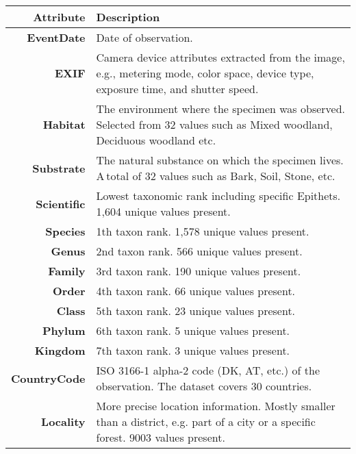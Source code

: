 \documentclass[10pt,twocolumn,letterpaper]{article}
\begin{document}
\begin{table}[b!]
\begin{center}
\vspace{-0.2cm}
\setlength{\tabcolsep}{0.28em} \begin{tabular}{| r  p{6.0cm}@{\hskip 5pt}  |}
    \hline
    \small{\textbf{Attribute}} & \small{\textbf{Description}} \\
    \hline
        \footnotesize{\textbf{EventDate}} & \footnotesize{Date of observation.} \\
\footnotesize{\textbf{EXIF}} & \footnotesize{Camera device attributes extracted from the image, e.g., metering mode, color space, device type, exposure time, and shutter speed.} \\
        \hline
        \footnotesize{\textbf{Habitat}} & \footnotesize{The environment where the specimen was observed. Selected from 32 values such as Mixed woodland, Deciduous woodland etc.}\\
        \footnotesize{\textbf{Substrate}} & \footnotesize{The natural substance on which the specimen lives. A\,total of 32 values such as Bark, Soil, Stone, etc.} \\
        \hline
        \footnotesize\textbf{{Scientific}} & \footnotesize{Lowest taxonomic rank including specific Epithets. 1,604 unique values present.} \\
        \footnotesize{\textbf{Species}} & \footnotesize1th taxon rank. 1,578 unique values present. \\ \footnotesize{\textbf{Genus}} & \footnotesize{2nd taxon rank. 566 unique values present.} \\
        \footnotesize{\textbf{Family}} & \footnotesize{3rd taxon rank. 190 unique values present.} \\
        \footnotesize{\textbf{Order}} & \footnotesize{4th taxon rank. 66 unique values present.} \\
        \footnotesize{\textbf{Class}} & \footnotesize{5th taxon rank. 23 unique values present.} \\
        \footnotesize{\textbf{Phylum}} & \footnotesize{6th taxon rank. 5 unique values present.} \\
        \footnotesize{\textbf{Kingdom}} & \footnotesize{7th taxon rank. 3 unique values present.} \\  
\hline
        \footnotesize{\textbf{CountryCode}} & \footnotesize{ISO 3166-1 alpha-2 code (DK, AT, etc.) of the observation. The dataset covers 30 countries.} \\ \footnotesize{\textbf{Locality}} & \footnotesize{More precise location information. Mostly smaller than a district, e.g. part of a city or a specific forest. 9003 values present.}  \\

\end{tabular}
\end{center}
\end{table}
\end{document}
